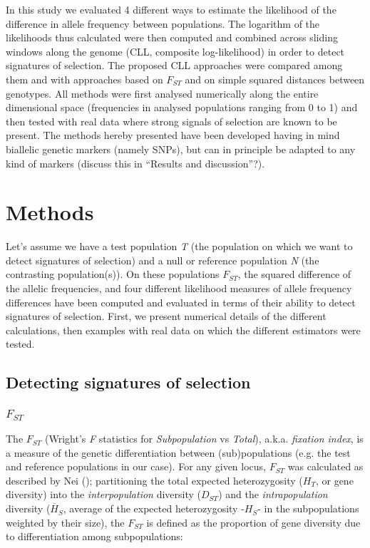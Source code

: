 \documentclass{bmcart}
\begin{document}
In this study we evaluated 4 different ways to estimate the likelihood
of the difference in allele frequency between populations. The logarithm
of the likelihoods thus calculated were then computed and combined across sliding windows
along the genome (CLL, composite log-likelihood) in order to detect
signatures of selection. The proposed CLL approaches were compared among
them and with approaches based on $F_{ST}$ and on simple squared
distances between genotypes. All methods were first analysed numerically
along the entire dimensional space (frequencies in analysed populations
ranging from 0 to 1) and then tested with real data where strong signals
of selection are known to be present. The methods hereby presented have
been developed having in mind biallelic genetic markers (namely SNPs),
but can in principle be adapted to any kind of markers (discuss this in
``Results and discussion''?).

\section*{Methods}

Let's assume we have a test population \emph{T} (the population on which we want to detect
signatures of selection) and a null or reference population \emph{N} (the
contrasting population(s)). On these populations $F_{ST}$, the squared
difference of the allelic frequencies, and four different likelihood
measures of allele frequency differences have been computed and
evaluated in terms of their ability to detect signatures of selection. 
First, we present numerical details of the different calculations, then
examples with real data on which the different estimators were tested.


\subsection*{Detecting signatures of selection}
\subsubsection*{$F_{ST}$}
The $F_{ST}$ (Wright's \emph{F} statistics for \emph{Subpopulation} vs
\emph{Total}), a.k.a. \emph{fixation index}, is a measure of the genetic
differentiation between (sub)populations (e.g. the test and reference
populations in our case). For any given locus, $F_{ST}$ was calculated as
described by Nei (\cite{nei1977f}); partitioning the total
expected heterozygosity ($H_T$, or gene diversity) into the
\emph{interpopulation} diversity ($D_{ST}$) and the
\emph{intrapopulation} diversity ($\overline{H}_S$, average of the
expected heterozygosity -$H_S$- in the subpopulations weighted by their size),
the $F_{ST}$ is defined as the proportion of gene diversity due to
differentiation among subpopulations:
\end{document}
